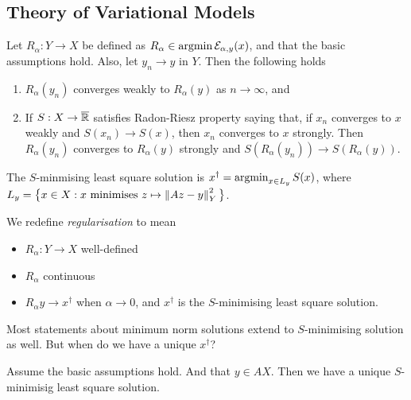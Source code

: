 \documentclass[12pt]{article}
\begin{document}
\subsection{Theory of Variational Models}
\begin{theorem}[Stability]
    Let $R_\alpha:Y\to X$ be defined as $R_\alpha\in \operatorname{argmin} \mathcal{E}_{\alpha,y}(x)$, and that the basic assumptions hold. Also, let $y_n\to y$ in $Y$. Then the following holds
    \begin{enumerate}[label=(\alph*)]
        \item $R_\alpha(y_n)$ converges weakly to $ R_\alpha(y)$ as $n\to\infty$, and
        \item If $S:X\to\overline{\mathbb{R}}$ satisfies Radon-Riesz property saying that, if $x_n$ converges to $x$ weakly and $S(x_n)\to S(x)$, then $x_n$ converges to $x$ strongly. Then $R_\alpha(y_n)$ converges to $R_\alpha(y)$ strongly and $S(R_\alpha(y_n))\to S(R_\alpha(y))$.
    \end{enumerate}
\end{theorem}

The $S$-minmising least square solution is $x^\dagger =\operatorname{argmin}_{x\in L_y} S(x)$, where $L_y= \big\{x\in X: x \text{ minimises } z\mapsto \left\lVert Az-y\right\rVert_Y^2\big\}$.

\begin{definition}
    We redefine \textit{regularisation} to mean
    \begin{itemize}
        \item $R_\alpha:Y\to X$ well-defined
        \item $R_\alpha$ continuous
        \item $R_\alpha y\to x^\dagger $ when $\alpha\to 0$, and $x^\dagger $ is the $S$-minimising least square solution. 
    \end{itemize}
\end{definition}
Most statements about minimum norm solutions extend to $S$-minimising solution as well. But when do we have a unique $x^\dagger $?

\begin{theorem}
    Assume the basic assumptions hold. And that $y\in AX$. Then we have a unique $S$-minimisig least square solution.
\end{theorem}
\end{document}
